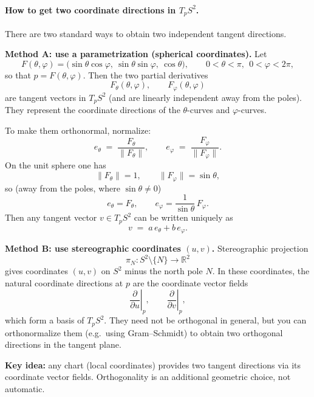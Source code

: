 \documentclass[12pt,a4paper]{article}
\theoremstyle{plain}
\theoremstyle{definition}      %
\begin{document}
\paragraph{How to get two coordinate directions in $T_pS^2$.}
There are two standard ways to obtain two independent tangent directions.

\medskip
\noindent\textbf{Method A: use a parametrization (spherical coordinates).}
Let
\[
F(\theta,\varphi)=\bigl(\sin\theta\cos\varphi,\ \sin\theta\sin\varphi,\ \cos\theta\bigr),
\qquad 0<\theta<\pi,\ \ 0<\varphi<2\pi,
\]
so that $p = F(\theta,\varphi)$. Then the two partial derivatives
\[
F_\theta(\theta,\varphi),\qquad F_\varphi(\theta,\varphi)
\]
are tangent vectors in $T_pS^2$ (and are linearly independent away from the poles).
They represent the coordinate directions of the $\theta$-curves and $\varphi$-curves.

To make them orthonormal, normalize:
\[
e_\theta \;=\;\frac{F_\theta}{\|F_\theta\|}, 
\qquad 
e_\varphi \;=\;\frac{F_\varphi}{\|F_\varphi\|}.
\]
On the unit sphere one has
\[
\|F_\theta\|=1,
\qquad 
\|F_\varphi\|=\sin\theta,
\]
so (away from the poles, where $\sin\theta\neq 0$)
\[
e_\theta = F_\theta,
\qquad
e_\varphi = \frac{1}{\sin\theta}\,F_\varphi.
\]
Then any tangent vector $v\in T_pS^2$ can be written uniquely as
\[
v \;=\; a\,e_\theta + b\,e_\varphi.
\]

\medskip
\noindent\textbf{Method B: use stereographic coordinates $(u,v)$.}
Stereographic projection
\[
\pi_N: S^2\setminus\{N\}\to \mathbb{R}^2
\]
gives coordinates $(u,v)$ on $S^2$ minus the north pole $N$.
In these coordinates, the natural coordinate directions at $p$ are the coordinate
vector fields
\[
\left.\frac{\partial}{\partial u}\right|_{p},
\qquad
\left.\frac{\partial}{\partial v}\right|_{p},
\]
which form a basis of $T_pS^2$. They need not be orthogonal in general, but you can
orthonormalize them (e.g.\ using Gram--Schmidt) to obtain two orthogonal directions
in the tangent plane.

\medskip
\noindent\textbf{Key idea:}
any chart (local coordinates) provides two tangent directions via its coordinate
vector fields. Orthogonality is an additional geometric choice, not automatic.
\end{document}
